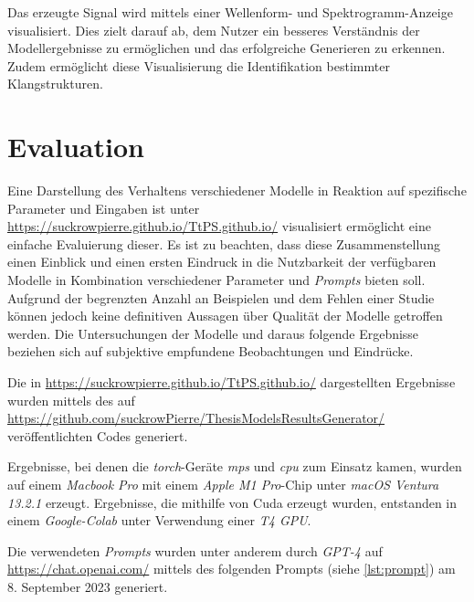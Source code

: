 \documentclass[
  a4paper,  %
  twoside,  %
  bibliography=totoc,
  headsepline,
  cleardoublepage=empty,
  parskip=half,
  draft=false
]{scrbook}
\begin{document}
Das erzeugte Signal wird mittels einer Wellenform- und Spektrogramm-Anzeige visualisiert. Dies zielt darauf ab, dem Nutzer ein besseres Verständnis der Modellergebnisse zu ermöglichen und das erfolgreiche Generieren zu erkennen. Zudem ermöglicht diese Visualisierung die Identifikation bestimmter Klangstrukturen.


\section{Evaluation}

Eine Darstellung des Verhaltens verschiedener Modelle in Reaktion auf spezifische Parameter und Eingaben ist unter \url{https://suckrowpierre.github.io/TtPS.github.io/} \cite{pierre-louis_suckrow_text-zu-spielbarem-klang_nodate} visualisiert ermöglicht eine einfache Evaluierung dieser. Es ist zu beachten, dass diese Zusammenstellung einen Einblick und einen ersten Eindruck in die Nutzbarkeit der verfügbaren Modelle in Kombination verschiedener Parameter und \emph{Prompts} bieten soll. Aufgrund der begrenzten Anzahl an Beispielen und dem Fehlen einer Studie können jedoch keine definitiven Aussagen über Qualität der Modelle getroffen werden. Die Untersuchungen der Modelle und daraus folgende Ergebnisse beziehen sich auf subjektive empfundene Beobachtungen und Eindrücke.  

Die in \url{https://suckrowpierre.github.io/TtPS.github.io/} \cite{pierre-louis_suckrow_text-zu-spielbarem-klang_nodate} dargestellten Ergebnisse wurden mittels des auf \url{https://github.com/suckrowPierre/ThesisModelsResultsGenerator/} veröffentlichten Codes generiert.

Ergebnisse, bei denen die \emph{torch}-Geräte \emph{mps} und \emph{cpu} zum Einsatz kamen, wurden auf einem \emph{Macbook Pro} mit einem \emph{Apple M1 Pro}-Chip unter \emph{macOS Ventura 13.2.1} erzeugt. Ergebnisse, die mithilfe von Cuda erzeugt wurden, entstanden in einem \emph{Google-Colab} unter Verwendung einer \emph{T4 GPU}.

Die verwendeten \emph{Prompts} wurden unter anderem durch \emph{GPT-4} \cite{openai_gpt-4_2023} auf \url{https://chat.openai.com/} mittels des folgenden Prompts (siehe \ref{lst:prompt}) am 8. September 2023 generiert.
\end{document}
